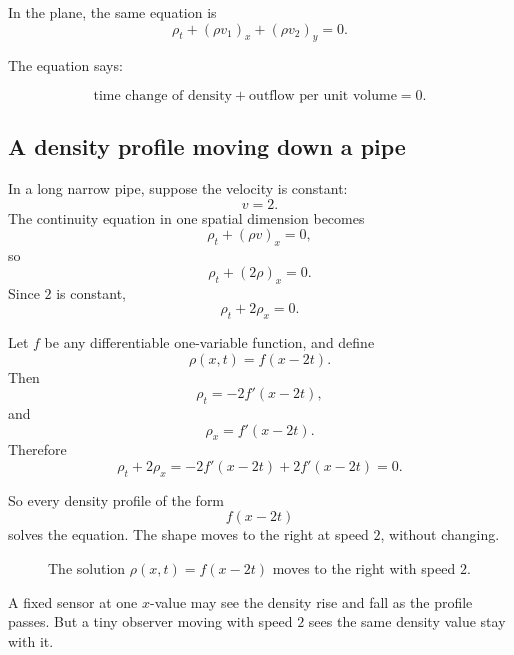In the plane, the same equation is
\[
\boxed{
    \rho_t+(\rho v_1)_x+(\rho v_2)_y=0.
}
\]

The equation says:

\[
\boxed{
    \text{time change of density}
    +
    \text{outflow per unit volume}
    =
    0.
}
\]

\subsection{A density profile moving down a pipe}

In a long narrow pipe, suppose the velocity is constant:
\[
    v=2.
\]
The continuity equation in one spatial dimension becomes
\[
    \rho_t+(\rho v)_x=0,
\]
so
\[
    \rho_t+(2\rho)_x=0.
\]
Since \(2\) is constant,
\[
\boxed{
    \rho_t+2\rho_x=0.
}
\]

Let \(f\) be any differentiable one-variable function, and define
\[
    \rho(x,t)=f(x-2t).
\]
Then
\[
    \rho_t=-2f'(x-2t),
\]
and
\[
    \rho_x=f'(x-2t).
\]
Therefore
\[
    \rho_t+2\rho_x
    =
    -2f'(x-2t)+2f'(x-2t)
    =
    0.
\]

So every density profile of the form
\[
    f(x-2t)
\]
solves the equation.  The shape moves to the right at speed \(2\), without changing.

\begin{figure}[h]
\centering
{}
\caption{The solution \(\rho(x,t)=f(x-2t)\) moves to the right with speed \(2\).}
\end{figure}

A fixed sensor at one \(x\)-value may see the density rise and fall as the profile passes.
But a tiny observer moving with speed \(2\) sees the same density value stay with it.

